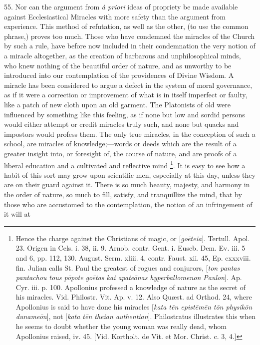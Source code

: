 55.
Nor can the argument from \emph{à priori} ideas of propriety be made
available against Ecclesiastical Miracles with more safety than the
argument from experience. This method of refutation, as well as the
other, (to use the common phrase,) proves too much. Those who have
condemned the miracles of the Church by such a rule, have before now
included in their condemnation the very notion of a miracle
altogether, as the creation of barbarous and unphilosophical minds,
who knew nothing of the beautiful order of nature, and as unworthy to
be introduced into our contemplation of the providences of Divine
Wisdom. A miracle has been considered to argue a defect in the system
of moral governance, as if it were a correction or improvement of what
is in itself imperfect or faulty, like a patch of new cloth upon an
old garment. The Platonists of old were influenced by something like
this feeling, as if none but low and sordid persons would either
attempt or credit miracles truly such, and none but quacks and
impostors would profess them. The only true miracles, in the
conception of such a school, are miracles of knowledge;—words or
deeds which are the result of a greater insight into, or foresight of,
the course of nature, and are proofs of a liberal education and a
cultivated and reflective mind \footnote{Hence the charge against the Christians of
magic, or [\emph{go\={e}teia}]. Tertull. Apol. 23. Origen in Cels.
i. 38, ii. 9. Arnob. contr. Gent. i. Euseb. Dem. Ev. iii. 5 and 6, pp.
112, 130. August. Serm. xliii. 4, contr. Faust. xii. 45, Ep. cxxxviii.
fin. Julian calls St. Paul the greatest of rogues and conjurors, [\emph{ton
pantas pantachou tous p\={o}pote go\={e}tas kai apate\={o}nas
hyperballomenon Paulon}]. Ap. Cyr. iii. p. 100. Apollonius
professed a knowledge of nature as the secret of his miracles. Vid.
Philostr. Vit. Ap. v. 12. Also Quæst. ad Orthod. 24, where Apollonius
is said to have done his miracles [\emph{kata t\={e}n epist\={e}m\={e}n
t\={o}n physik\={o}n duname\={o}n}], not [\emph{kata t\={e}n
theian authentian}]. Philostratus illustrates this when he seems to
doubt whether the young woman was really dead, whom Apollonius raised,
iv. 45. [Vid. Kortholt. de Vit. et Mor. Christ. c. 3, 4.]}. It is easy to see how a
habit of this sort may grow upon scientific men, especially at this
day, unless they are on their guard against it. There is so much
beauty, majesty, and harmony in the order of nature, so much to fill,
satisfy, and tranquillize the mind, that by those who are accustomed
to the contemplation, the notion of an infringement of it will at

